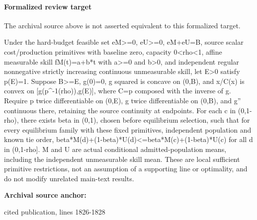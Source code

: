 \documentclass[10pt]{article}
\begin{document}
\paragraph{Formalized review target}
The archival source above is not asserted equivalent to this formalized target.
\begin{ReviewVerbatim}
Under the hard-budget feasible set eM>=0, eU>=0, eM+eU=B, source scalar cost/production primitives with baseline zero, capacity 0<rho<1, affine measurable skill fM(t)=a+b*t with a>=0 and b>0, and independent regular nonnegative strictly increasing continuous unmeasurable skill, let E>0 satisfy p(E)=1. Suppose B>=E, g(0)=0, g squared is concave on (0,B), and x/C(x) is convex on [g(p^{-1}(rho)),g(E)], where C=p composed with the inverse of g. Require p twice differentiable on (0,E), g twice differentiable on (0,B), and g'' continuous there, retaining the source continuity at endpoints. For each c in (0,1-rho), there exists beta in (0,1), chosen before equilibrium selection, such that for every equilibrium family with these fixed primitives, independent population and known tie order, beta*M(d)+(1-beta)*U(d)<=beta*M(c)+(1-beta)*U(c) for all d in (0,1-rho]. M and U are actual conditional admitted-population means, including the independent unmeasurable skill mean. These are local sufficient primitive restrictions, not an assumption of a supporting line or optimality, and do not modify unrelated main-text results.
\end{ReviewVerbatim}

\textbf{Archival source anchor:} {\footnotesize\raggedright cited publication, lines 1826-\allowbreak{}1828\par}
\end{document}
